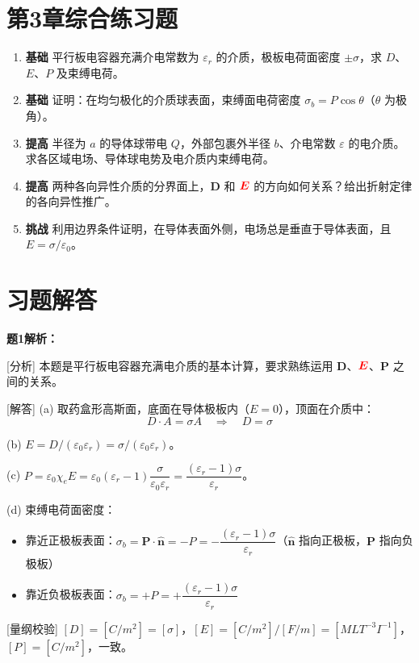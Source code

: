 \documentclass[11pt,a4paper,openany,oneside]{book}
\newcommand{\vecE}{\textcolor{red}{\vect{E}}}
\newcommand{\eps}{\varepsilon}
\newcommand{\vect}[1]{\bm{#1}}
\newcommand{\unitvec}[1]{\hat{\vect{#1}}}
\begin{document}
\section*{第3章综合练习题}
\begin{enumerate}[label=\textbf{\arabic*.}]
\item \textbf{基础} 平行板电容器充满介电常数为 $\eps_r$ 的介质，极板电荷面密度 $\pm\sigma$，求 $D$、$E$、$P$ 及束缚电荷。
\item \textbf{基础} 证明：在均匀极化的介质球表面，束缚面电荷密度 $\sigma_b = P\cos\theta$（$\theta$ 为极角）。
\item \textbf{提高} 半径为 $a$ 的导体球带电 $Q$，外部包裹外半径 $b$、介电常数 $\eps$ 的电介质。求各区域电场、导体球电势及电介质内束缚电荷。
\item \textbf{提高} 两种各向异性介质的分界面上，$\vect{D}$ 和 $\vecE$ 的方向如何关系？给出折射定律的各向异性推广。
\item \textbf{挑战} 利用边界条件证明，在导体表面外侧，电场总是垂直于导体表面，且 $E=\sigma/\eps_0$。
\end{enumerate}
\newpage
\section*{习题解答}

\textbf{题1解析：}

[分析] 本题是平行板电容器充满电介质的基本计算，要求熟练运用 $\vect{D}$、$\vecE$、$\vect{P}$ 之间的关系。

[解答] (a) 取药盒形高斯面，底面在导体极板内（$E=0$），顶面在介质中：
\[
D \cdot A = \sigma A \quad\Rightarrow\quad D = \sigma
\]

(b) $E = D/(\eps_0\eps_r) = \sigma/(\eps_0\eps_r)$。

(c) $P = \eps_0\chi_e E = \eps_0(\eps_r - 1)\dfrac{\sigma}{\eps_0\eps_r} = \dfrac{(\eps_r - 1)\sigma}{\eps_r}$。

(d) 束缚电荷面密度：
\begin{itemize}
\item 靠近正极板表面：$\sigma_b = \vect{P}\cdot\unitvec{n} = -P = -\dfrac{(\eps_r - 1)\sigma}{\eps_r}$（$\unitvec{n}$ 指向正极板，$\vect{P}$ 指向负极板）
\item 靠近负极板表面：$\sigma_b = +P = +\dfrac{(\eps_r - 1)\sigma}{\eps_r}$
\end{itemize}

[量纲校验] $[D] = [C/m^2] = [\sigma]$，$[E] = [C/m^2]/[F/m] = [MLT^{-3}I^{-1}]$，$[P] = [C/m^2]$，一致。\qedsymbol
\end{document}

